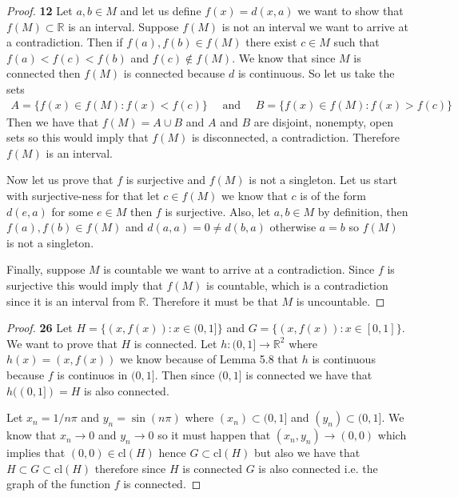 \documentclass[11pt]{article}
\newcommand{\R}{\mathbb{R}}
\newcommand{\cl}{\text{cl}}
\theoremstyle{definition}
\begin{document}
	\begin{proof}{\textbf{12}}
        Let $a,b \in M$ and let us define $f(x) = d(x,a)$ we want to show that
        $f(M) \subset \R$ is an interval. Suppose $f(M)$ is not an
        interval we want to arrive at a contradiction. Then if
        $f(a),f(b) \in f(M)$ there exist $c \in M$ such that
        $f(a) < f(c) < f(b)$ and $f(c) \not\in f(M)$. We know that since $M$
        is connected then $f(M)$ is connected because $d$ is continuous.
        So let us take the sets
        \begin{align*}
            A = \{f(x) \in f(M): f(x) < f(c)\} \quad\text{ and }\quad
            B = \{f(x) \in f(M): f(x) > f(c)\}
        \end{align*}
        Then we have that $f(M) = A \cup B$ and $A$ and $B$ are disjoint,
        nonempty, open sets so this would imply that $f(M)$ is disconnected,
        a contradiction. Therefore $f(M)$ is an interval.
        
        Now let us prove that $f$ is surjective and $f(M)$ is not a
        singleton. Let us start with surjective-ness for that let $c \in f(M)$
        we know that $c$ is of the form $d(e,a)$ for some $e \in M$ then $f$
        is surjective. Also, let $a,b \in M$ by definition, then
        $f(a), f(b) \in f(M)$ and $d(a,a)= 0 \neq d(b,a)$ otherwise $a=b$ so
        $f(M)$ is not a singleton.

        Finally, suppose $M$ is countable we want to arrive at a
        contradiction. Since $f$ is surjective this would imply that $f(M)$ is
        countable, which is a contradiction since it is an interval from $\R$.
        Therefore it must be that $M$ is uncountable. 
    \end{proof}
	\begin{proof}{\textbf{26}}
        Let $H = \{(x,f(x)) : x \in (0,1]\}$ and $G = \{(x,f(x)) : x \in [0,1]\}$.
        We want to prove that $H$ is connected. Let $h: (0,1] \to \R^2$ where
        $h(x) = (x, f(x))$ we know because of Lemma 5.8 that $h$ is continuous
        because $f$ is continuos in $(0,1]$.
        Then since $(0,1]$ is connected we have that $h((0,1]) = H$ is also
        connected.

        Let $x_n = 1/n\pi$ and $y_n = \sin(n\pi)$ where $(x_n)\subset(0,1]$ and
        $(y_n) \subset (0,1]$. We know that $x_n \to 0$ and 
        $y_n \to 0$ so it must happen that $(x_n,y_n) \to (0,0)$ which implies
        that $(0,0) \in \cl(H)$ hence $G \subset \cl(H)$ but also we have that
        $H \subset G \subset \cl(H)$ therefore since $H$ is connected $G$ is
        also connected i.e. the graph of the function $f$ is connected.    
    \end{proof}
\end{document}
